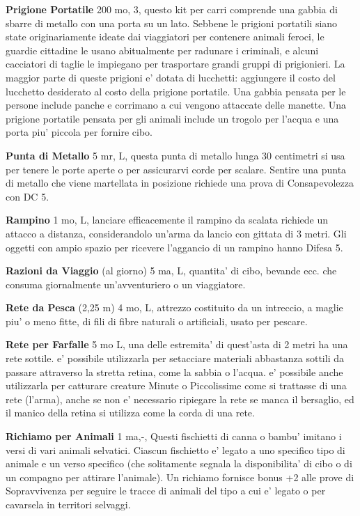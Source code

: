 \documentclass[a4paper,11pt,twoside,openany]{book}
\begin{document}
{\textbf{Prigione Portatile} 200 mo, 3, questo kit per carri comprende una gabbia di sbarre di metallo con una porta su un lato. Sebbene le prigioni portatili siano state originariamente ideate dai viaggiatori per contenere animali feroci, le guardie cittadine le usano abitualmente per radunare i criminali, e alcuni cacciatori di taglie le impiegano per trasportare grandi gruppi di prigionieri. La maggior parte di queste prigioni e' dotata di lucchetti: aggiungere il costo del lucchetto desiderato al costo della prigione portatile. Una gabbia pensata per le persone include panche e corrimano a cui vengono attaccate delle manette. Una prigione portatile pensata per gli animali include un trogolo per l'acqua e una porta piu' piccola per fornire cibo.

\textbf{Punta di Metallo} 5 mr, L, questa punta di metallo lunga 30 centimetri si usa per tenere le porte aperte o per assicurarvi corde per scalare. Sentire una punta di metallo che viene martellata in posizione richiede una prova di Consapevolezza con DC 5.

\textbf{Rampino} 1 mo, L, lanciare efficacemente il rampino da scalata richiede un attacco a distanza, considerandolo un'arma da lancio con gittata di 3 metri. Gli oggetti con ampio spazio per ricevere l'aggancio di un rampino hanno Difesa 5.

\textbf{Razioni da Viaggio} (al giorno) 5 ma, L, quantita' di cibo, bevande ecc. che consuma giornalmente un'avventuriero o un viaggiatore.

\textbf{Rete da Pesca} (2,25 m) 4 mo, L, attrezzo costituito da un intreccio, a maglie piu' o meno fitte, di fili di fibre naturali o artificiali, usato per pescare.

\textbf{Rete per Farfalle} 5 mo L, una delle estremita' di quest'asta di 2 metri ha una rete sottile. e' possibile utilizzarla per setacciare materiali abbastanza sottili da passare attraverso la stretta retina, come la sabbia o l'acqua. e' possibile anche utilizzarla per catturare creature Minute o Piccolissime come si trattasse di una rete (l'arma), anche se non e' necessario ripiegare la rete se manca il bersaglio, ed il manico della retina si utilizza come la corda di una rete.

\textbf{Richiamo per Animali} 1 ma,-, Questi fischietti di canna o bambu' imitano i versi di vari animali selvatici. Ciascun fischietto e' legato a uno specifico tipo di animale e un verso specifico (che solitamente segnala la disponibilita' di cibo o di un compagno per attirare l'animale). Un richiamo fornisce bonus +2 alle prove di Sopravvivenza per seguire le tracce di animali del tipo a cui e' legato o per cavarsela in territori selvaggi.

}
\end{document}
